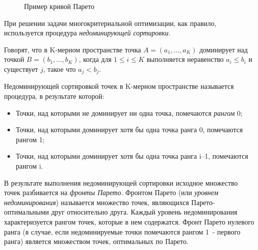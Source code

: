 	\begin{figure}[h!]
		\caption{Пример кривой Парето}
		\label{pict:par1}
	\end{figure}

При решении задачи многокритериальной оптимизации, как правило, используется процедура 
\textit{недоминирующей сортировки}.~\cite{deb_nsga2}
	
Говорят,  что  в K-мерном  пространстве  точка $A = (a_1, ..., a_K)$ доминирует  над  
точкой $B = (b_1,  ..., b_K)$, когда для $1 \le i \le K $ выполняется неравенство 
$a_i \le b_i $ и существует $j$, такое что $a_j < b_j $.

Недоминирующей сортировкой точек в K-мерном пространстве называется процедура, в результате которой:
\begin{itemize}
\item Точки, над которыми не доминирует ни одна точка, помечаются \textit{рангом} 0;
\item Точки, над которыми доминирует хотя бы одна точка ранга 0, помечаются рангом 1;
\item Точки, над которыми доминирует хотя бы одна точка ранга i–1, помечаются рангом i.
\end{itemize}

В результате выполнения недоминирующей сортировки исходное множество точек разбивается на 
\textit{фронты Парето}. Фронтом Парето (или \textit{уровнем недоминирования}) называется 
множество точек, являющихся Парето-оптимальными друг относительно друга. Каждый уровень 
недоминирования характеризуется рангом точек, которые в нем содержатся. Фронт Парето нулевого 
ранга (в случае, если недоминируемые точки помечаются рангом 1~- первого ранга) является множеством 
точек, оптимальных по Парето.


